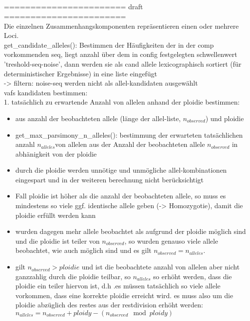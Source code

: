 \subsection{} \label{subsec:}
======================= draft =======================\\
Die einzelnen Zusammenhangskomponenten repräsentieren einen oder mehrere Loci.\\
get\_candidate\_alleles(): Bestimmen der Häufigkeiten der in der comp vorkommenden seq, liegt anzahl über dem in config festgelegten schwellenwert 'treshold-seq-noise', dann werden sie als cand allele lexicographisch sortiert (für deterministischer Ergebnisse) in eine liste eingefügt\\
-> filtern: noise-seq werden nicht als allel-kandidaten ausgewählt \\
vafs kandidaten bestimmen:\\
1. tatsächlich zu erwartende Anzahl von allelen anhand der ploidie bestimmen:
\begin{itemize}
	\item aus anzahl der beobachteten allele (länge der allel-liste, $n_{observed}$) und ploidie
	\item get\_max\_parsimony\_n\_alleles(): bestimmung der erwarteten tatsächlichen anzahl $n_{alleles}$von allelen aus der Anzahl der beobachteten allele $n_{observed}$ in abhänigkeit von der ploidie
	\item durch die ploidie werden unnötige und unmögliche allel-kombinationen   eingespart und in der weiteren berechnung nicht berücksichtigt
	\item Fall ploidie ist höher als die anzahl der beobachteten allele, so muss es mindestens so viele ggf. identische allele geben (-> Homozygotie), damit die ploidie erfüllt werden kann\\
	\item wurden dagegen mehr allele beobachtet als aufgrund der ploidie möglich sind und die ploidie ist teiler von $n_{observed}$, so wurden genauso viele allele beobachtet, wie auch möglich sind und es gilt $n_{observed} = n_{alleles}$. 
	\item gilt $n_{observed}>ploidie$ und ist die beobachtete anzahl von allelen aber nicht ganzzahlig durch die ploidie teilbar, so $n_{alleles}$ so erhöht werden, dass die ploidie ein teiler hiervon ist, d.h .es müssen tatsächlich so viele allele vorkommen, dass eine korrekte ploidie erreicht wird. es muss also um die ploidie abzüglich des restes aus der restdivision erhöht werden: $ n_{alleles} = n_{observed} + ploidy - (n_{observed} \mod ploidy)$
\end{itemize}


